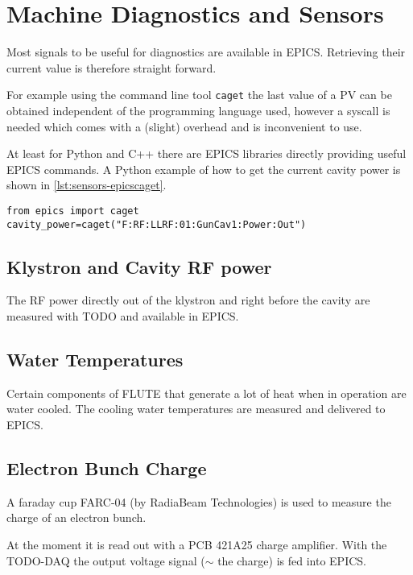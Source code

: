 \chapter{Machine Diagnostics and Sensors}
Most signals to be useful for diagnostics are available in EPICS. Retrieving their current value is therefore straight forward.

For example using the command line tool \texttt{caget} the last value of a PV can be obtained independent of the programming language used, however a syscall is needed which comes with a (slight) overhead and is inconvenient to use.

At least for Python and C++ there are EPICS libraries directly providing useful EPICS commands. A Python example of how to get the current cavity power is shown in \autoref{lst:sensors-epicscaget}.

\begin{lstlisting}[style=python,caption = Get an EPICS PV with python, label = lst:sensors-epicscaget]
from epics import caget
cavity_power=caget("F:RF:LLRF:01:GunCav1:Power:Out")
\end{lstlisting}

\section{Klystron and Cavity RF power}
The RF power directly out of the klystron and right before the cavity are measured with TODO and available in EPICS.

\section{Water Temperatures}
Certain components of FLUTE that generate a lot of heat when in operation are water cooled. The cooling water temperatures are measured and delivered to EPICS. 

\section{Electron Bunch Charge}
A faraday cup FARC-04\cite{radiabeamFaradayCups} (by RadiaBeam Technologies) is used to measure the charge of an electron bunch.

At the moment it is read out with a PCB 421A25\cite{pcbsynotechPCB421A25Charge} charge amplifier. With the TODO-DAQ the output voltage signal ($\sim$ the charge) is fed into EPICS.





